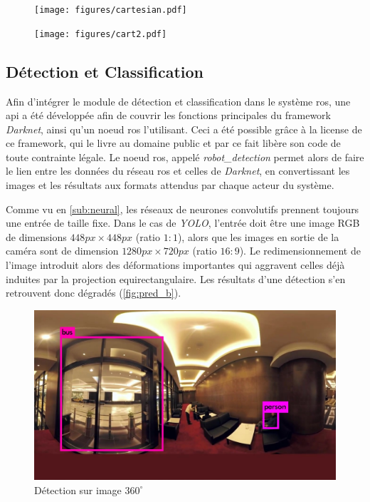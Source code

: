 			\begin{figure}[H]
				\centering
				\begin{minipage}{.5\textwidth}
					\centering
					\texttt{[image: figures/cartesian.pdf]}
					\label{fig:platlong}
				\end{minipage}%
				\begin{minipage}{.5\textwidth}
					\centering
					\texttt{[image: figures/cart2.pdf]}
					\label{fig:pequirect}
				\end{minipage}
			\end{figure}
			\par

		\subsection{Détection et Classification}
		
			Afin d'intégrer le module de détection et classification dans le système \gls{ros}, une \gls{api} a été développée afin de couvrir les fonctions principales du framework \emph{Darknet}, ainsi qu'un noeud \gls{ros} l'utilisant. Ceci a été possible grâce à la license de ce framework, qui le livre au domaine public et par ce fait libère son code de toute contrainte légale. Le noeud \gls{ros}, appelé \emph{robot\_detection} permet alors de faire le lien entre les données du réseau \gls{ros} et celles de \emph{Darknet}, en convertissant les images et les résultats aux formats attendus par chaque acteur du système.
			\par
			Comme vu en \autoref{sub:neural}, les réseaux de neurones convolutifs prennent toujours une entrée de taille fixe.
			Dans le cas de \emph{YOLO}, l'entrée doit être une image RGB de dimensions $ 448px \times 448px $ (ratio $1:1$), alors que les images en sortie de la caméra sont de dimension $ 1280px \times 720px$ (ratio $16:9$).
			Le redimensionnement de l'image introduit alors des déformations importantes qui aggravent celles déjà induites par la projection equirectangulaire.
			Les résultats d'une détection s'en retrouvent donc dégradés (\autoref{fig:pred_b}).
			\begin{figure}[H]
			{
				\centering
				\includegraphics[width=.8\textwidth]{figures/predictions_bad.jpg}
				\caption{Détection sur image $360^{\circ}$}
				\label{fig:pred_b}
			}
			\end{figure}
			
